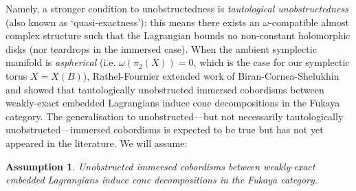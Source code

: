 \documentclass[10pt]{amsart}
\newtheorem{assumption}[thm]{Assumption}
\theoremstyle{definition}
\theoremstyle{remark}
\begin{document}
Namely, a stronger condition to unobstructedness is \emph{tautological unobstructedness} (also known as `quasi-exactness'): this means there exists an $\omega$-compatible almost complex structure such that the Lagrangian bounds no non-constant holomorphic disks (nor teardrops in the immersed case).
When the ambient symplectic manifold is \emph{aspherical} (i.e. $\omega(\pi_2(X))=0$, which is the case for our symplectic torus $X = X(B)$), Rathel-Fournier \cite[Theorem A]{rathel2023unobstructed} extended work of Biran-Cornea-Shelukhin \cite{biran2021lagrangian} and showed that tautologically unobstructed immersed cobordisms between weakly-exact embedded Lagrangians induce cone decompositions in the Fukaya category.
The generalisation to unobstructed---but not necessarily tautologically unobstructed---immersed cobordisms is expected to be true but has not yet appeared in the literature.
We will assume:
\begin{assumption}\label{assumption:decompositions}
    Unobstructed immersed cobordisms between weakly-exact embedded Lagrangians induce cone decompositions in the Fukaya category.
\end{assumption}
\end{document}
